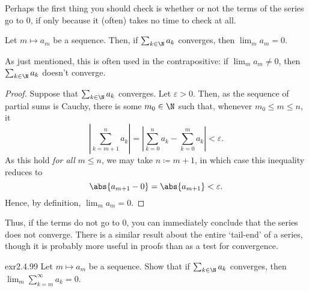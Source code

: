 Perhaps the first thing you should check is whether or not the terms of the series go to $0$, if only because it (often) takes no time to check at all.
\begin{prp}{}{}
Let $m\mapsto a_m$ be a sequence.  Then, if $\sum _{k\in \N}a_k$ converges, then $\lim _ma_m=0$.
\begin{rmk}
As just mentioned, this is often used in the contrapositive:  if $\lim _ma_m\neq 0$, then $\sum _{k\in \N}a_k$ doesn't converge.
\end{rmk}
\begin{proof}
Suppose that $\sum _{k\in \N}a_k$ converges.  Let $\varepsilon >0$.  Then, as the sequence of partial sums is Cauchy, there is some $m_0\in \N$ such that, whenever $m_0\leq m\leq n$, it 
\begin{equation}
\left| \sum _{k=m+1}^na_k\right| =\left| \sum _{k=0}^na_k-\sum _{k=0}^ma_k\right| <\varepsilon .
\end{equation}
As this hold \emph{for all} $m\leq n$, we may take $n\coloneqq m+1$, in which case this inequality reduces to
\begin{equation}
\abs{a_{m+1}-0}=\abs{a_{m+1}}<\varepsilon .
\end{equation}
Hence, by definition, $\lim _ma_m=0$.
\end{proof}
\end{prp}
Thus, if the terms do not go to $0$, you can immediately conclude that the series does not converge.  There is a similar result about the entire `tail-end' of a series, though it is probably more useful in proofs than as a test for convergence.
\begin{exr}{}{exr2.4.99}
Let $m\mapsto a_m$ be a sequence.  Show that if $\sum _{k\in \N}a_k$ converges, then $\lim _m\sum _{k=m}^{\infty}a_k=0$.
\end{exr}
